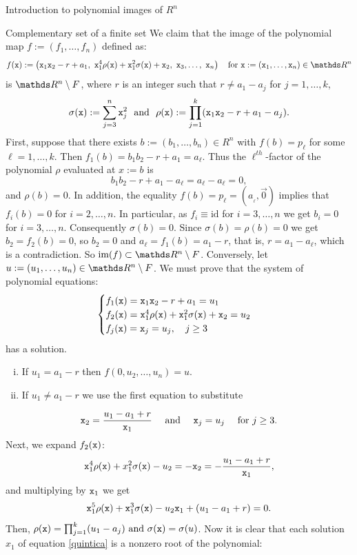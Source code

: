 \documentclass[11pt, a4paper, english, twoside, notitlepage, openright]{report}
\begin{document}
\begin{chapter}{Introduction to polynomial images of $R^n$}
\begin{section}{Complementary set of a finite set}
We claim that the image of the polynomial map $f:=(f_1,\dots,f_n)$ defined as:
$$
f({\tt x}):=\left({\tt x}_1{\tt x}_2-r+a_1,\ {\tt x}_1^{4}\rho({\tt x})+{\tt x}_1^{2}\sigma({\tt x})+{\tt x}_2,\ {\tt x}_3,\dots,\ {\tt x}_n\right)\quad\text{for ${\tt x}:=({\tt x}_1,\ldots,{\tt x}_n)\in\R^n$}
$$
is $\R^n\setminus F$, where $r$ is an integer such that $r\neq a_1-a_j$ for $j=1,\dots,k$,  
$$
\sigma({\tt x}):=\sum_{j=3}^n{\tt x}_j^2 \, \, \text{ and } \, \, \rho({\tt x}):=\prod_{j=1}^k({\tt x}_1{\tt x}_2-r+a_1-a_j).
$$
First, suppose that there exists $b:=(b_{1},\dots,b_{n})\in R^n$ with $f(b)=p_\ell$ for some $\ell=1,\dots,k$. Then $f_1(b)=b_1b_2-r+a_1=a_\ell$. Thus the $\ell^{th}$-factor of the polynomial $\rho$ evaluated at $x:=b$ is
$$
b_1b_2-r+a_1-a_\ell=a_\ell-a_\ell=0,
$$		 
and $\rho(b)=0$. In addition, the equality $f(b)=p_\ell=(a_{_\ell},\vec{0})$ implies that $f_i(b)=0$ for $i=2,\dots,n$. In particular, as $f_i\equiv\text{id}$ for $i=3,\dots,n$ we get $b_i=0$ for $i=3,\dots,n$. Consequently $\sigma(b)=0$. Since $\sigma(b)=\rho(b)=0$ we get $b_2=f_2(b)= 0$, so $b_2=0$ and $a_{\ell}=f_1(b)=a_1-r$, that is, $r=a_1-a_\ell$, which is a contradiction. So $\text{im}(f)\subset \R^n\setminus F$.
Conversely, let $u:=(u_1,\dots,u_n)\in\R^n\setminus F$. We must prove that the system of polynomial equations:
\[ \begin{cases} 
f_1({\tt x})={\tt x}_1{\tt x}_2-r+a_1=u_1 \\
f_2({\tt x})={\tt x}_1^4\rho({\tt x})+{\tt x}_1^2\sigma({\tt x})+{\tt x}_2=u_2 \\
f_j({\tt x})={\tt x}_j=u_j,\quad j\geq 3
\end{cases}  \]
has a solution.
\begin{enumerate}[(i)]
\item If $u_1=a_1-r$ then $f(0,u_2,\dots,u_n)=u$.
\item If $u_1\neq a_1-r$ we use the first equation to substitute 
\end{enumerate}
$$
{\tt x}_2=\frac{u_1-a_1+r}{{\tt x}_1} \quad \text{ and } \quad {\tt x}_j=u_j \quad \text{ for } j\geq 3.
$$ 
Next, we expand $f_2({\tt x})$:
$$
{\tt x}_1^4\rho({\tt x})+x_1^2\sigma({\tt x})-u_2=-{\tt x}_2=-\frac{u_1-a_1+r}{{\tt x}_1},
$$ 
and multiplying by ${\tt x}_1$ we get 
\begin{equation}\label{quintica}
{\tt x}_1^5\rho({\tt x})+{\tt x}_1^3\sigma({\tt x})-u_2{\tt x}_1+(u_1-a_1+r)=0.
\end{equation}
Then, $\rho({\tt x})=\prod_{j=1}^k(u_1-a_j) \text{ and } \sigma({\tt x})=\sigma(u)$. Now it is clear that each solution $x_1$ of equation \eqref{quintica} is a nonzero root of the polynomial:

\end{section}
\end{chapter}
\end{document}
